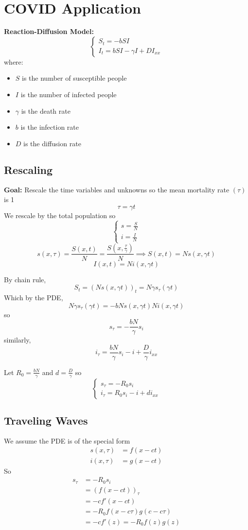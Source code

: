 \documentclass[10pt]{article}
\begin{document}
\section{COVID Application}
\textbf{Reaction-Diffusion Model:}
\[\begin{cases}
    S_t = -bSI\\
    I_t = bSI - \gamma I + DI_{xx}
\end{cases}\]
where:
\begin{itemize}
    \item $S$ is the number of susceptible people
    \item $I$ is the number of infected people 
    \item $\gamma$ is the death rate
    \item $b$ is the infection rate
    \item $D$ is the diffusion rate
\end{itemize}

\subsection{Rescaling}
\textbf{Goal:} Rescale the time variables and unknowns so the mean mortality rate $(\tau)$ is 1
\[\tau = \gamma t\]
We rescale by the total population so 
\[\begin{cases}
    s = \frac{S}{N}\\
    i = \frac{I}{N}
\end{cases}\]
\[s(x, \tau) = \frac{S(x, t)}{N} = \frac{S(x, \frac{\tau}{\gamma})}{N} \implies S(x, t) = Ns(x, \gamma t)\]
\[I(x, t) = Ni(x, \gamma t)\]

By chain rule, 
\[S_t = (Ns(x, \gamma t))_t = N\gamma s_\tau(\gamma t)\]
Which by the PDE, 
\[N\gamma s_\tau(\gamma t) = -bNs(x, \gamma t)Ni(x, \gamma t)\]
so 
\[s_\tau = -\frac{bN}{\gamma}s_i\]
similarly, 
\[i_\tau = \frac{bN}{\gamma}s_i - i + \frac{D}{\gamma}i_{xx}\]

Let $R_0 = \frac{bN}{\gamma}$ and $d = \frac{D}{\gamma}$ so
\[\begin{cases}
    s_\tau = -R_0 s_i\\
    i_\tau = R_0s_i - i + di_{xx}
\end{cases}\]

\subsection{Traveling Waves}
We assume the PDE is of the special form 
\begin{align*}
    s(x, \tau) &= f(x - ct)\\
    i(x, \tau) &= g(x - ct)
\end{align*}
So 
\begin{align*}
    s_\tau &= -R_0 s_i\\
    &= (f(x - ct))_\tau\\
    &= -cf'(x- ct)\\
    &= -R_0 f(x - c\tau)g(c - c\tau)\\
    &= -cf'(z) = - R_0 f(z)g(z)
\end{align*}
\end{document}
